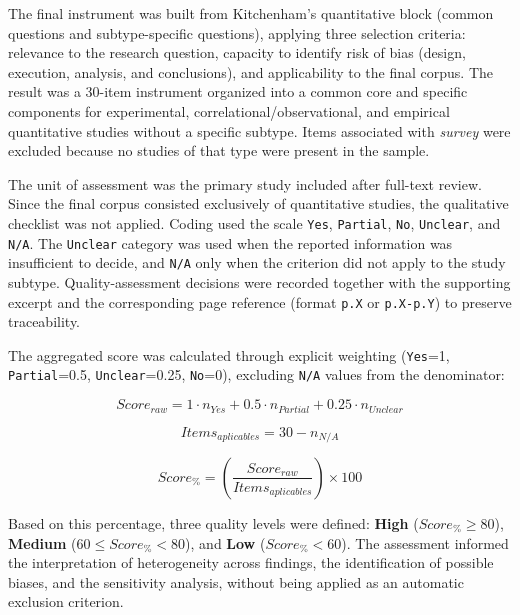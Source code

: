 The final instrument was built from Kitchenham's quantitative block \cite{kitchenham2007} (common questions and subtype-specific questions), applying three selection criteria: relevance to the research question, capacity to identify risk of bias (design, execution, analysis, and conclusions), and applicability to the final corpus. The result was a 30-item instrument organized into a common core and specific components for experimental, correlational/observational, and empirical quantitative studies without a specific subtype. Items associated with \textit{survey} were excluded because no studies of that type were present in the sample.

The unit of assessment was the primary study included after full-text review. Since the final corpus consisted exclusively of quantitative studies, the qualitative checklist was not applied. Coding used the scale \texttt{Yes}, \texttt{Partial}, \texttt{No}, \texttt{Unclear}, and \texttt{N/A}. The \texttt{Unclear} category was used when the reported information was insufficient to decide, and \texttt{N/A} only when the criterion did not apply to the study subtype. Quality-assessment decisions were recorded together with the supporting excerpt and the corresponding page reference (format \texttt{p.X} or \texttt{p.X-p.Y}) to preserve traceability.

The aggregated score was calculated through explicit weighting (\texttt{Yes}=1, \texttt{Partial}=0.5, \texttt{Unclear}=0.25, \texttt{No}=0), excluding \texttt{N/A} values from the denominator:

\begin{equation}
\textit{Score}_{raw} = 1\cdot n_{Yes} + 0.5\cdot n_{Partial} + 0.25\cdot n_{Unclear}
\end{equation}

\begin{equation}
\textit{Items}_{aplicables} = 30 - n_{N/A}
\end{equation}

\begin{equation}
\textit{Score}_{\%} = \left( \frac{\textit{Score}_{raw}}{\textit{Items}_{aplicables}} \right)\times 100
\end{equation}

Based on this percentage, three quality levels were defined: \textbf{High} (\(\textit{Score}_{\%}\geq 80\)), \textbf{Medium} (\(60 \leq \textit{Score}_{\%} < 80\)), and \textbf{Low} (\(\textit{Score}_{\%}<60\)). The assessment informed the interpretation of heterogeneity across findings, the identification of possible biases, and the sensitivity analysis, without being applied as an automatic exclusion criterion.

